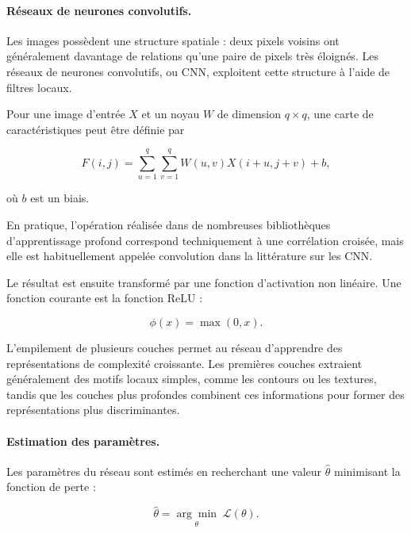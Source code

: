 \documentclass[11pt,a4paper]{report}
\begin{document}
\paragraph{Réseaux de neurones convolutifs.}

Les images possèdent une structure spatiale : deux pixels voisins ont
généralement davantage de relations qu'une paire de pixels très éloignés.
Les réseaux de neurones convolutifs, ou CNN, exploitent cette structure à
l'aide de filtres locaux.

Pour une image d'entrée $X$ et un noyau $W$ de dimension $q \times q$, une
carte de caractéristiques peut être définie par

\begin{equation}
    F(i,j)
    =
    \sum_{u=1}^{q}
    \sum_{v=1}^{q}
    W(u,v)X(i+u,j+v)+b,
    \label{eq:convolution}
\end{equation}

où $b$ est un biais.

En pratique, l'opération réalisée dans de nombreuses bibliothèques
d'apprentissage profond correspond techniquement à une corrélation croisée,
mais elle est habituellement appelée convolution dans la littérature sur les
CNN.

Le résultat est ensuite transformé par une fonction d'activation non linéaire.
Une fonction courante est la fonction ReLU :

\begin{equation}
    \phi(x)=\max(0,x).
\end{equation}

L'empilement de plusieurs couches permet au réseau d'apprendre des
représentations de complexité croissante. Les premières couches extraient
généralement des motifs locaux simples, comme les contours ou les textures,
tandis que les couches plus profondes combinent ces informations pour former
des représentations plus discriminantes.

\paragraph{Estimation des paramètres.}

Les paramètres du réseau sont estimés en recherchant une valeur
$\widehat{\theta}$ minimisant la fonction de perte :

\begin{equation}
    \widehat{\theta}
    =
    \underset{\theta}{\arg\min}
    \;
    \mathcal{L}(\theta).
\end{equation}
\end{document}
